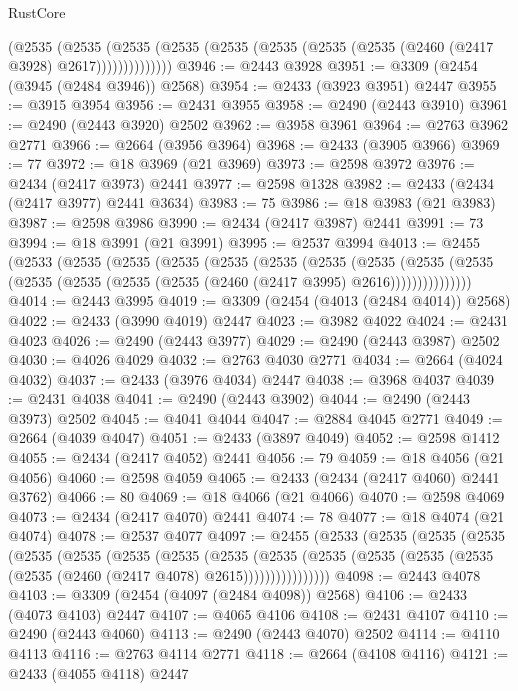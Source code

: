 \begin{lexlean}{RustCore}
\begin{coremodule}
              (@2535
                (@2535
                  (@2535 (@2535 (@2535 (@2535 (@2535 (@2535 (@2460 (@2417 @3928) @2617))))))))))))))
@3946 := @2443 @3928
@3951 := @3309 (@2454 (@3945 (@2484 @3946)) @2568)
@3954 := @2433 (@3923 @3951) @2447
@3955 := @3915 @3954
@3956 := @2431 @3955
@3958 := @2490 (@2443 @3910)
@3961 := @2490 (@2443 @3920) @2502
@3962 := @3958 @3961
@3964 := @2763 @3962 @2771
@3966 := @2664 (@3956 @3964)
@3968 := @2433 (@3905 @3966)
@3969 := 77
@3972 := @18 @3969 (@21 @3969)
@3973 := @2598 @3972
@3976 := @2434 (@2417 @3973) @2441
@3977 := @2598 @1328
@3982 := @2433 (@2434 (@2417 @3977) @2441 @3634)
@3983 := 75
@3986 := @18 @3983 (@21 @3983)
@3987 := @2598 @3986
@3990 := @2434 (@2417 @3987) @2441
@3991 := 73
@3994 := @18 @3991 (@21 @3991)
@3995 := @2537 @3994
@4013 := @2455
    (@2533
      (@2535
        (@2535
          (@2535
            (@2535
              (@2535
                (@2535
                  (@2535
                    (@2535
                      (@2535 (@2535 (@2535 (@2535 (@2535 (@2460 (@2417 @3995) @2616)))))))))))))))
@4014 := @2443 @3995
@4019 := @3309 (@2454 (@4013 (@2484 @4014)) @2568)
@4022 := @2433 (@3990 @4019) @2447
@4023 := @3982 @4022
@4024 := @2431 @4023
@4026 := @2490 (@2443 @3977)
@4029 := @2490 (@2443 @3987) @2502
@4030 := @4026 @4029
@4032 := @2763 @4030 @2771
@4034 := @2664 (@4024 @4032)
@4037 := @2433 (@3976 @4034) @2447
@4038 := @3968 @4037
@4039 := @2431 @4038
@4041 := @2490 (@2443 @3902)
@4044 := @2490 (@2443 @3973) @2502
@4045 := @4041 @4044
@4047 := @2884 @4045 @2771
@4049 := @2664 (@4039 @4047)
@4051 := @2433 (@3897 @4049)
@4052 := @2598 @1412
@4055 := @2434 (@2417 @4052) @2441
@4056 := 79
@4059 := @18 @4056 (@21 @4056)
@4060 := @2598 @4059
@4065 := @2433 (@2434 (@2417 @4060) @2441 @3762)
@4066 := 80
@4069 := @18 @4066 (@21 @4066)
@4070 := @2598 @4069
@4073 := @2434 (@2417 @4070) @2441
@4074 := 78
@4077 := @18 @4074 (@21 @4074)
@4078 := @2537 @4077
@4097 := @2455
    (@2533
      (@2535
        (@2535
          (@2535
            (@2535
              (@2535
                (@2535
                  (@2535
                    (@2535
                      (@2535
                        (@2535
                          (@2535 (@2535 (@2535 (@2535 (@2460 (@2417 @4078) @2615))))))))))))))))
@4098 := @2443 @4078
@4103 := @3309 (@2454 (@4097 (@2484 @4098)) @2568)
@4106 := @2433 (@4073 @4103) @2447
@4107 := @4065 @4106
@4108 := @2431 @4107
@4110 := @2490 (@2443 @4060)
@4113 := @2490 (@2443 @4070) @2502
@4114 := @4110 @4113
@4116 := @2763 @4114 @2771
@4118 := @2664 (@4108 @4116)
@4121 := @2433 (@4055 @4118) @2447

\end{coremodule}
\end{lexlean}
